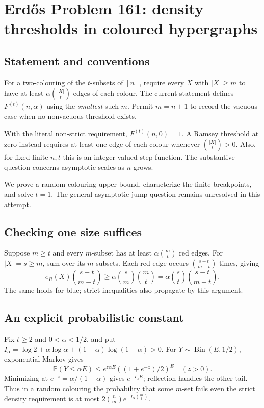 \section*{Erd\H{o}s Problem 161: density thresholds in coloured hypergraphs}
\subsection*{Statement and conventions}
For a two-colouring of the $t$-subsets of $[n]$, require every $X$ with $|X|\ge m$ to have at least $\alpha\binom{|X|}{t}$ edges of each colour. The current statement defines $F^{(t)}(n,\alpha)$ using the \emph{smallest} such $m$. Permit $m=n+1$ to record the vacuous case when no nonvacuous threshold exists.

With the literal non-strict requirement, $F^{(t)}(n,0)=1$. A Ramsey threshold at zero instead requires at least one edge of each colour whenever $\binom{|X|}{t}>0$. Also, for fixed finite $n,t$ this is an integer-valued step function. The substantive question concerns asymptotic scales as $n$ grows.

We prove a random-colouring upper bound, characterize the finite breakpoints, and solve $t=1$. The general asymptotic jump question remains unresolved in this attempt.

\subsection*{Checking one size suffices}
Suppose $m\ge t$ and every $m$-subset has at least $\alpha\binom mt$ red edges. For $|X|=s\ge m$, sum over its $m$-subsets. Each red edge occurs $\binom{s-t}{m-t}$ times, giving
\[
 e_R(X)\binom{s-t}{m-t}\ge\alpha\binom sm\binom mt
 =\alpha\binom st\binom{s-t}{m-t}.
\]
The same holds for blue; strict inequalities also propagate by this argument.

\subsection*{An explicit probabilistic constant}
Fix $t\ge2$ and $0<\alpha<1/2$, and put
$I_\alpha=\log2+\alpha\log\alpha+(1-\alpha)\log(1-\alpha)>0$.
For $Y\sim\operatorname{Bin}(E,1/2)$, exponential Markov gives
\[
 \mathbb P(Y\le\alpha E)
 \le e^{z\alpha E}((1+e^{-z})/2)^E
 \quad(z>0).
\]
Minimizing at $e^{-z}=\alpha/(1-\alpha)$ gives $e^{-I_\alpha E}$; reflection handles the other tail. Thus in a random colouring the probability that some $m$-set fails even the strict density requirement is at most
$2\binom nm e^{-I_\alpha\binom mt}$.

